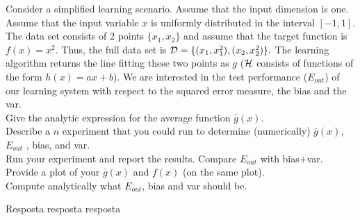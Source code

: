 \begin{enunciado}{24}
    Consider a simplified learning scenario. Assume that the input dimension is one.     Assume that the input variable $x$ is uniformly distributed in the interval         $[-1,1]$. The data set consists of $2$ points $\{x_{1}, x_{2}\}$ and assume that     the target function is $f(x) = x^{2}$. Thus, the full data set is $\mathcal{D} = \{       (x_{1}, x_{1}^{2}), (x_{2}, x_{2}^{2})\}.$  The learning algorithm returns the      line fitting these two points as $g$ ($\mathcal{H}$ consists of functions of the      form $h(x) = ax + b$). We are interested in the test performance ($E_{out}$) of     our learning system with respect to the squared error measure, the bias and the     var. \\
    
     Give the analytic expression for the average function $\bar{g}(x)$. \\
    
     Describe a $n$ experiment that you could run to determine                 (numerically) $\bar{g}(x)$, $E_{out}$ , bias, and var. \\
    
     Run your experiment and report the results. Compare $E_{out}$ with        bias+var. Provide a plot of your $\bar{g}(x)$ and $f(x)$ (on the same plot). \\
    
     Compute analytically what $E_{out}$,  bias and var should be.
\end{enunciado}

Resposta resposta resposta